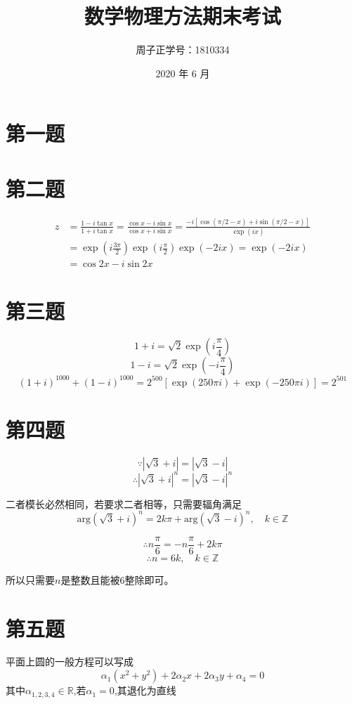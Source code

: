 \documentclass[a4paper]{ctexart}
\title{数学物理方法\quad 期末考试}
\author{周子正\quad 学号：1810334}
\date{2020 年 6 月}
\begin{document}
\maketitle
\section{第一题}

\section{第二题}

$$
    \begin{aligned}
        z & =\frac{1-i\tan x}{1+i\tan x}=\frac{\cos x-i\sin x}{\cos x+i\sin x}=\frac{-i\left[ \cos \left( \pi /2-x \right) +i\sin \left( \pi /2-x \right) \right]}{\exp \left( ix \right)} \\
          & =\exp \left( i\frac{3\pi}{2} \right) \exp \left( i\frac{\pi}{2} \right) \exp \left( -2ix \right) =\exp \left( -2ix \right)                                                     \\
          & =\cos 2x-i\sin 2x
    \end{aligned}
$$


\section{第三题}

$$
    1+i=\sqrt{2}\exp \left( i\frac{\pi}{4} \right)
$$
$$
    1-i=\sqrt{2}\exp \left( -i\frac{\pi}{4} \right)
$$
$$
    \left( 1+i \right) ^{1000}+\left( 1-i \right) ^{1000}=2^{500}\left[ \exp \left( 250\pi i \right) +\exp \left( -250\pi i \right) \right] =2^{501}
$$


\section{第四题}

$$
    \because |\sqrt{3}+i|=|\sqrt{3}-i|
$$
$$
    \therefore |\sqrt{3}+i|^n=|\sqrt{3}-i|^n
$$

二者模长必然相同，若要求二者相等，只需要辐角满足
$$
    \text{arg}\left( \sqrt{3}+i \right) ^n=2k\pi +\text{arg}\left( \sqrt{3}-i \right) ^n,\quad k\in \mathbb{Z}
$$

$$
    \therefore n\frac{\pi}{6}=-n\frac{\pi}{6}+2k\pi
$$
$$
    \therefore n=6k,\quad k\in \mathbb{Z}
$$

所以只需要$n$是整数且能被$6$整除即可。

\section{第五题}
平面上圆的一般方程可以写成
$$
\alpha _1\left( x^2+y^2 \right) +2\alpha _2x+2\alpha _3y+\alpha _4=0
$$
其中$\alpha_{1,2,3,4}\in\mathbb{R}$,若$\alpha_1=0$,其退化为直线
\end{document}
